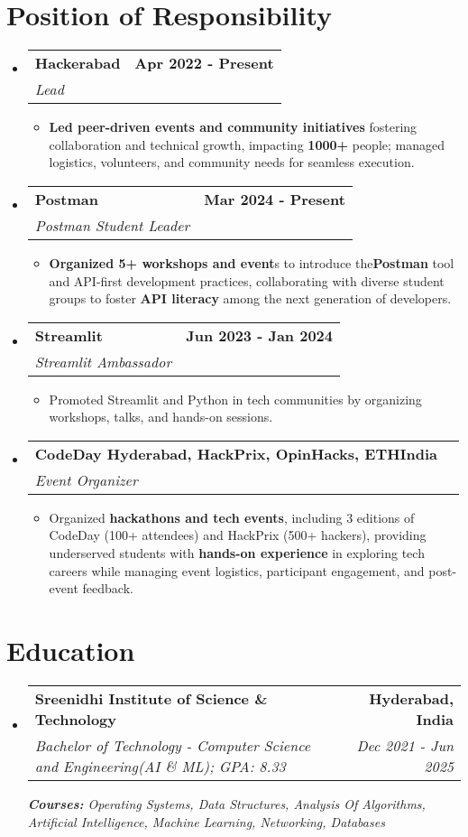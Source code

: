 \documentclass[letterpaper,11pt]{article}
\makeatletter
\newcommand{\resumeItem}[1]{
  \item\small{
    {#1 \vspace{-2pt}}
  }
}
\newcommand{\resumeSubheading}[4]{
  \vspace{-2pt}\item
    \begin{tabular*}{1.0\textwidth}[t]{l@{\extracolsep{\fill}}r}
      \textbf{#1} & \textbf{\small #2} \\
      \textit{\small#3} & \textit{\small #4} \\
    \end{tabular*}\vspace{-7pt}
}
\newcommand{\resumeSubHeadingListStart}{\begin{itemize}[leftmargin=0.0in, label={}]}
\newcommand{\resumeSubHeadingListEnd}{\end{itemize}}
\newcommand{\resumeItemListStart}{\begin{itemize}}
\newcommand{\resumeItemListEnd}{\end{itemize}\vspace{-5pt}}
\makeatother
\begin{document}
\section{Position of Responsibility}
  \resumeSubHeadingListStart
  \resumeSubheading
      {Hackerabad}{Apr 2022 - Present}{Lead}{}
      \resumeItemListStart
        \resumeItem{\textbf{Led peer-driven events and community initiatives} fostering collaboration and technical growth, impacting \textbf{1000+} people; managed logistics, volunteers, and community needs for seamless execution.}
      \resumeItemListEnd
    \resumeSubheading
      {Postman}{Mar 2024 - Present}{Postman Student Leader}{}
      \resumeItemListStart
        \resumeItem{\textbf{Organized 5+ workshops and event}s to introduce the\textbf{Postman} tool and API-first development practices, collaborating with diverse student groups to foster \textbf{API literacy} among the next generation of developers.}
      \resumeItemListEnd
      \resumeSubheading
    {Streamlit}{Jun 2023 - Jan 2024}
    {Streamlit Ambassador}{}
    \resumeItemListStart
        \resumeItem{Promoted Streamlit and Python in tech communities by organizing workshops, talks, and hands-on sessions.}
    \resumeItemListEnd

    

    \resumeSubheading
      {CodeDay Hyderabad, HackPrix, OpinHacks, ETHIndia}{} {Event Organizer}{}
      \resumeItemListStart
        \resumeItem{Organized \textbf{hackathons and tech events}, including 3 editions of CodeDay (100+ attendees) and HackPrix (500+ hackers), providing underserved students with \textbf{hands-on experience} in exploring tech careers while managing event logistics, participant engagement, and post-event feedback.}
      \resumeItemListEnd
      

  \resumeSubHeadingListEnd
\section{Education}
  \resumeSubHeadingListStart
    \resumeSubheading
      {Sreenidhi Institute of Science \& Technology}{Hyderabad, India}
      {Bachelor of Technology - Computer Science and Engineering(AI \& ML); GPA: 8.33}{Dec 2021 - Jun 2025}
      {\scriptsize \textit{ \footnotesize{\newline{}\textbf{Courses:} Operating Systems, Data Structures, Analysis Of Algorithms, Artificial Intelligence, Machine Learning, Networking, Databases}}}
  \resumeSubHeadingListEnd
 \vspace{-16pt}
\end{document}
